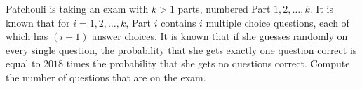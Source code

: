 Patchouli is taking an exam with $k > 1$ parts, numbered Part $1, 2, \dots, k$. It is known that for $i = 1, 2, \dots, k$, Part $i$ contains $i$ multiple choice questions, each of which has $(i+1)$ answer choices. It is known that if she guesses randomly on every single question, the probability that she gets exactly one question correct is equal to $2018$ times the probability that she gets no questions correct. Compute the number of questions that are on the exam.
